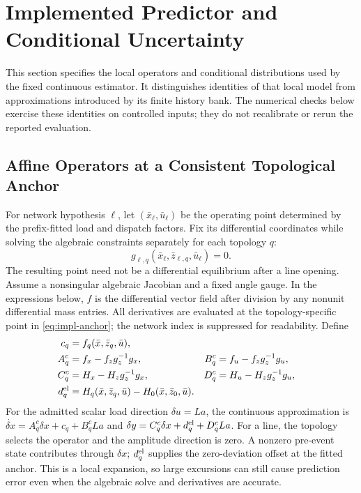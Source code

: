 \section{Implemented Predictor and Conditional Uncertainty}
\label{app:implemented-filter}

This section specifies the local operators and conditional distributions
used by the fixed continuous estimator. It distinguishes identities of
that local model from approximations introduced by its finite history
bank. The numerical checks below exercise these identities on controlled
inputs; they do not recalibrate or rerun the reported evaluation.

\subsection{Affine Operators at a Consistent Topological Anchor}
\label{app:affine-operators}

For network hypothesis $\ell$, let $(\bar x_\ell,\bar u_\ell)$ be the
operating point determined by the prefix-fitted load and dispatch factors.
Fix its differential coordinates while
solving the algebraic constraints separately for each topology $q$:
\begin{equation}
 g_{\ell,q}(\bar x_\ell,\bar z_{\ell,q},\bar u_\ell)=0.
 \label{eq:impl-anchor}
\end{equation}
The resulting point need not be a differential equilibrium after a line
opening. Assume a nonsingular algebraic Jacobian and a fixed angle gauge.
In the expressions below, $f$ is the differential vector field after
division by any nonunit differential mass entries. All derivatives are
evaluated at the topology-specific point in \eqref{eq:impl-anchor}; the
network index is suppressed for readability. Define
\begin{align}
 c_q&=f_q(\bar x,\bar z_q,\bar u),\nonumber\\
 A_q^c&=f_x-f_zg_z^{-1}g_x,&
 B_q^c&=f_u-f_zg_z^{-1}g_u,\nonumber\\
 C_q^c&=H_x-H_zg_z^{-1}g_x,&
 D_q^c&=H_u-H_zg_z^{-1}g_u,\nonumber\\
 d_q^{\rm el}&=H_q(\bar x,\bar z_q,\bar u)
                  -H_0(\bar x,\bar z_0,\bar u).
 \label{eq:impl-affine-continuous}
\end{align}
For the admitted scalar load direction $\delta u=La$, the continuous
approximation is $\dot{\delta x}=A_q^c\delta x+c_q+B_q^cLa$ and
$\delta y=C_q^c\delta x+d_q^{\rm el}+D_q^cLa$.
For a line, the topology selects the operator and the amplitude direction
is zero. A nonzero pre-event state contributes through $\delta x$;
$d_q^{\rm el}$ supplies the zero-deviation offset at the fitted anchor.
This is a local expansion, so large excursions can still cause prediction
error even when the algebraic solve and derivatives are accurate.

